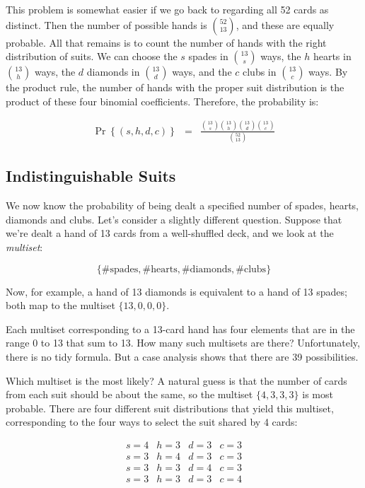 \documentclass[twoside,12pt]{article}
\newcommand{\beqn}{\begin{eqnarray*}}
\newcommand{\eeqn}{\end{eqnarray*}}
\newcommand{\pr}[1]{\Pr\left\{#1\right\}}
\begin{document}
This problem is somewhat easier if we go back to regarding all 52
cards as distinct.  Then the number of possible hands is
$\binom{52}{13}$, and these are equally probable.  All that remains is
to count the number of hands with the right distribution of suits.  We
can choose the $s$ spades in $\binom{13}{s}$ ways, the $h$ hearts in
$\binom{13}{h}$ ways, the $d$ diamonds in $\binom{13}{d}$ ways, and
the $c$ clubs in $\binom{13}{c}$ ways.  By the product rule, the
number of hands with the proper suit distribution is the product of
these four binomial coefficients.  Therefore, the probability is:

\beqn
\pr{(s, h, d, c)} & = &
    \frac{\binom{13}{s}\binom{13}{h}\binom{13}{d}\binom{13}{c}}{\binom{52}{13}}
\eeqn

\subsection{Indistinguishable Suits}

We now know the probability of being dealt a specified number of
spades, hearts, diamonds and clubs.  Let's consider a slightly
different question.  Suppose that we're dealt a hand of 13 cards from
a well-shuffled deck, and we look at the {\em multiset}:

\[
\{ \text{\# spades}, \text{\# hearts}, \text{\# diamonds}, \text{\# clubs} \}
\]

\noindent Now, for example, a hand of 13 diamonds is equivalent to a
hand of 13 spades; both map to the multiset $\{ 13, 0, 0, 0 \}$.

Each multiset corresponding to a 13-card hand has four elements that
are in the range 0 to 13 that sum to 13.  How many such multisets
are there?  Unfortunately, there is no tidy formula.  But a case
analysis shows that there are 39 possibilities.

Which multiset is the most likely?  A natural guess is that the number
of cards from each suit should be about the same, so the multiset $\{
4, 3, 3, 3 \}$ is most probable.  There are four different suit
distributions that yield this multiset, corresponding to the four ways
to select the suit shared by 4 cards:

\[
\begin{array}{cccc}
s = 4 & h = 3 & d = 3 & c = 3 \\
s = 3 & h = 4 & d = 3 & c = 3 \\
s = 3 & h = 3 & d = 4 & c = 3 \\
s = 3 & h = 3 & d = 3 & c = 4
\end{array}
\]
\end{document}
